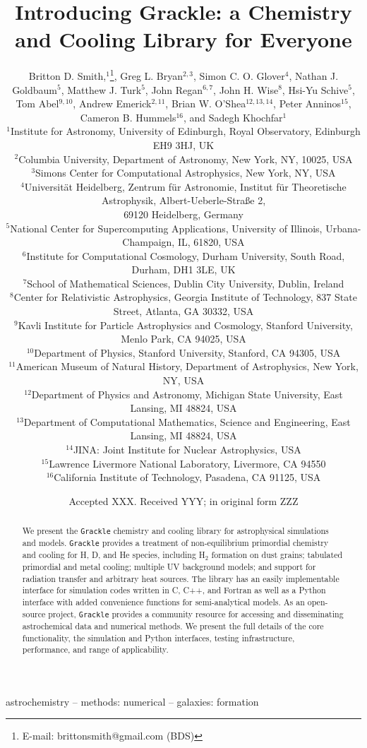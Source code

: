 \documentclass[a4paper,fleqn,usenatbib]{mnras}
\title[The Grackle]{Introducing Grackle: a Chemistry and Cooling
  Library for Everyone}
\author[B.D. Smith et al.]
       {Britton D. Smith,$^{1}$\thanks{E-mail: brittonsmith@gmail.com
           (BDS)},
        Greg L. Bryan$^{2,3}$,
        Simon C. O. Glover$^{4}$,
        Nathan J. Goldbaum$^{5}$, \newauthor
        Matthew J. Turk$^{5}$,
        John Regan$^{6,7}$,
        John H. Wise$^{8}$,
        Hsi-Yu Schive$^{5}$,
        Tom Abel$^{9,10}$, \newauthor
        Andrew Emerick$^{2,11}$,
        Brian W. O'Shea$^{12,13,14}$,
        Peter Anninos$^{15}$, \newauthor
        Cameron B. Hummels$^{16}$,
        and Sadegh Khochfar$^{1}$\\
$^{1}$Institute for Astronomy, University of Edinburgh, Royal
Observatory, Edinburgh EH9 3HJ, UK\\
$^{2}$Columbia University, Department of Astronomy, New York, NY,
10025, USA\\
$^{3}$Simons Center for Computational Astrophysics, New York, NY,
USA\\
$^{4}$Universit\"{a}t Heidelberg, Zentrum f\"{u}r Astronomie, Institut
f\"{u}r Theoretische Astrophysik, Albert-Ueberle-Stra{\ss}e 2, \\69120
Heidelberg, Germany\\
$^{5}$National Center for Supercomputing Applications, University of
Illinois, Urbana-Champaign, IL, 61820, USA\\
$^{6}$Institute for Computational Cosmology, Durham University, South
Road, Durham, DH1 3LE, UK \\
$^{7}$School of Mathematical Sciences, Dublin City University, Dublin,
Ireland \\
$^{8}$Center for Relativistic Astrophysics, Georgia Institute of
Technology, 837 State Street, Atlanta, GA 30332, USA\\
$^{9}$Kavli Institute for Particle Astrophysics and Cosmology,
Stanford University, Menlo Park, CA 94025, USA\\
$^{10}$Department of Physics, Stanford University, Stanford, CA 94305,
USA\\
$^{11}$American Museum of Natural History, Department of Astrophysics,
New York, NY, USA\\
$^{12}$Department of Physics and Astronomy, Michigan State University,
East Lansing, MI 48824, USA\\
$^{13}$Department of Computational Mathematics, Science and
Engineering, East Lansing, MI 48824, USA\\
$^{14}$JINA: Joint Institute for Nuclear Astrophysics, USA\\
$^{15}$Lawrence Livermore National Laboratory, Livermore, CA 94550\\
$^{16}$California Institute of Technology, Pasadena, CA 91125, USA\\
}
\date{Accepted XXX. Received YYY; in original form ZZZ}
\begin{document}
\label{firstpage}
\pagerange{\pageref{firstpage}--\pageref{lastpage}}
\maketitle

\begin{abstract}
We present the \texttt{Grackle} chemistry and cooling library for
astrophysical simulations and models.  \texttt{Grackle} provides
a treatment of non-equilibrium primordial chemistry and cooling for H, D, and He
species, including H$_{2}$ formation on dust grains; tabulated
primordial and metal cooling; multiple UV background models; and
support for radiation transfer and arbitrary heat sources.  The
library has an easily implementable interface for simulation codes
written in C, C++, and Fortran as well as a Python interface with
added convenience functions for semi-analytical models.  As an
open-source project, \texttt{Grackle} provides a community resource
for accessing and disseminating astrochemical data and numerical
methods.  We present the full details of the core functionality, the
simulation and Python interfaces, testing infrastructure, performance,
and range of applicability.
\end{abstract}

\begin{keywords}
astrochemistry -- methods: numerical -- galaxies: formation
\end{keywords}

















\footnotesize{
  
  
}

\bsp
\label{lastpage}
\end{document}

